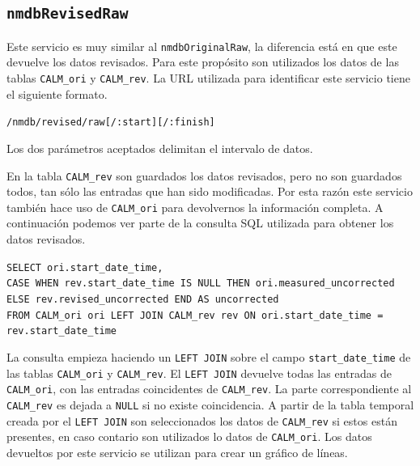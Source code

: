 	\subsection{\texttt{nmdbRevisedRaw}}
		Este servicio es muy similar al \texttt{nmdbOriginalRaw}, la diferencia está en que este devuelve los datos revisados. Para este
		propósito son utilizados los datos de las tablas \texttt{CALM\_ori} y \texttt{CALM\_rev}. La URL utilizada para identificar este
		servicio tiene el siguiente formato.
	  		\begin{center} \texttt{/nmdb/revised/raw[/:start][/:finish]}  \end{center} 
		Los dos parámetros aceptados delimitan el intervalo de datos.
		\par
		En la tabla \texttt{CALM\_rev} son guardados los datos revisados, pero no son guardados todos, tan sólo las entradas que han sido
		modificadas. Por esta razón este servicio también hace uso de \texttt{CALM\_ori} para devolvernos la información completa. A
		continuación podemos ver parte de la consulta SQL utilizada para obtener los datos revisados.
			\begin{center} \texttt{SELECT ori.start\_date\_time,
			  		\\	CASE WHEN rev.start\_date\_time IS NULL THEN ori.measured\_uncorrected ELSE rev.revised\_uncorrected END AS uncorrected 
					\\	FROM CALM\_ori ori LEFT JOIN CALM\_rev rev ON ori.start\_date\_time = rev.start\_date\_time}
			\end{center} 
		La consulta empieza haciendo un \texttt{LEFT JOIN} sobre el campo \texttt{start\_date\_time} de las tablas \texttt{CALM\_ori} y
		\texttt{CALM\_rev}. El \texttt{LEFT JOIN} devuelve todas las entradas de \texttt{CALM\_ori}, con las entradas coincidentes de
		\texttt{CALM\_rev}. La parte correspondiente al \texttt{CALM\_rev} es dejada a \texttt{NULL} si no existe coincidencia. A partir de la
		tabla temporal creada por el \texttt{LEFT JOIN} son seleccionados los datos de \texttt{CALM\_rev} si estos están presentes, en caso
		contario son utilizados lo datos de \texttt{CALM\_ori}. Los datos devueltos por este servicio se utilizan para crear un gráfico
		de líneas.
